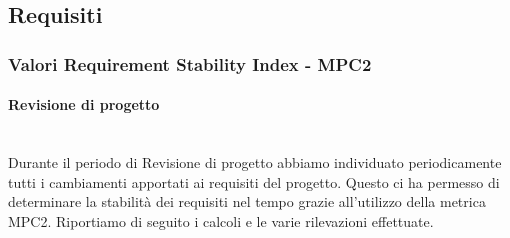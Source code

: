 \subsection{Requisiti}
\subsubsection{Valori Requirement Stability Index - MPC2}
\paragraph{Revisione di progetto}
\noindent \\
Durante il periodo di Revisione di progetto abbiamo individuato periodicamente tutti i cambiamenti apportati ai requisiti del progetto. Questo ci ha permesso di determinare la stabilità dei requisiti nel tempo grazie all'utilizzo della metrica MPC2.
Riportiamo di seguito i calcoli e le varie rilevazioni effettuate.

